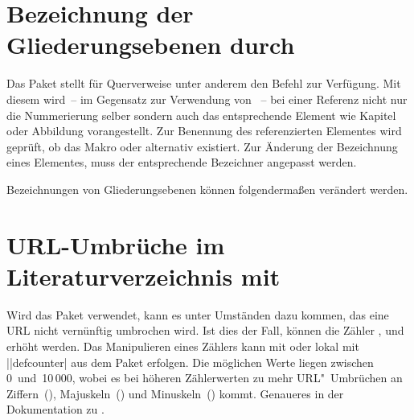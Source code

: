 \section{%
  Bezeichnung der Gliederungsebenen durch %
  \label{sec:tips:references}%
}
%
%
Das Paket  stellt für Querverweise unter anderem den Befehl 
 zur Verfügung. Mit diesem wird~-- im Gegensatz 
zur Verwendung von ~-- bei einer Referenz nicht nur die Nummerierung 
selber sondern auch das entsprechende Element wie Kapitel oder Abbildung 
vorangestellt. Zur Benennung des referenzierten Elementes wird geprüft, ob das 
Makro  oder alternativ 
 existiert. Zur Änderung der Bezeichnung eines 
Elementes, muss der entsprechende Bezeichner angepasst werden.
%
\begin{Example}
Bezeichnungen von Gliederungsebenen können folgendermaßen verändert werden.
\begin{Code}
\end{Code}
\end{Example}



\section{%
  URL-Umbrüche im Literaturverzeichnis mit %
}
%
%
Wird das Paket  verwendet, kann es unter Umständen dazu 
kommen, das eine URL nicht vernünftig umbrochen wird. Ist dies der Fall, 
können die Zähler ,  und 
 erhöht werden. Das Manipulieren eines Zählers kann 
mit  oder lokal mit 
\Macro||{defcounter|} aus dem Paket  erfolgen. 
Die möglichen Werte liegen zwischen 0~und~10\,000, wobei es bei höheren 
Zählerwerten zu mehr URL"~Umbrüchen an Ziffern~(), 
Majuskeln~() und Minuskeln~() 
kommt. Genaueres in der Dokumentation zu .



